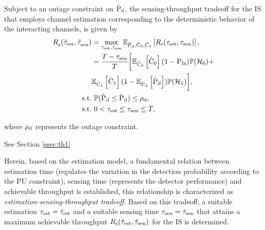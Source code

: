 \begin{theorem} \label{th_IS:th2}
\normalfont
Subject to an outage constraint on $\hat{\text{P}}_{\text{d}}$, the sensing-throughput tradeoff for the IS that employs channel estimation corresponding to the deterministic behavior of the interacting channels, is given by  
\begin{align}
{R}_{\text{s}}^{\text{}}(\tilde{\tau}_{\text{est}}, \tilde{\tau}_{\text{sen}}^{\text{}}) &= \operatorname*{max}_{\tau_{\text{est}}, \tau_{\text{sen}}} {\mathbb E}_{\hat{\text{P}}_{\text{d}}, \hat{\text{C}}_{\text{0}}, \hat{\text{C}}_{\text{1}}}\left[ R_{\text{s}}(\tau_{\text{est}}, \tau_{\text{sen}}) \right], \nonumber \\ 
\quad &= \frac{T- \tau_{\text{sen}}}{T} \bigg[ {\mathbb E}_{\hat{\text{C}}_{\text{0}}}\left[ \hat{\text{C}}_{\text{0}} \right] (1 - \text{P}_{\text{fa}}) \mathbb P(\mathcal{H}_0) + \nonumber \\ \quad & {\mathbb E}_{\hat{\text{C}}_{\text{1}}}\left[ \hat{\text{C}}_{\text{1}} \right] (1 - {\mathbb E}_{\hat{\text{P}}_{\text{d}}}\left[ \hat{\text{P}}_{\text{d}} \right]) \mathbb P(\mathcal{H}_1)  \bigg], \label{eq_IS:thr_OC} \\
\text{s.t.} & \text{ }  \mathbb P(\hat{\text{P}}_{\text{d}} \le \bar{\text{P}}_{\text{d}}) \le \rho_{\text{d}}, \label{eq_IS:OC} \\
\text{s.t.} & \text{ }  0 < \tau_{\text{est}} \le \tau_{\text{sen}} \le T, \nonumber
\end{align}
\end{theorem} 
where $\rho_{\text{d}}$ represents the outage constraint. 

\begin{IEEEproof} 
See Section \ref{ssec:th1}
\end{IEEEproof} 


\begin{remark} \label{rem:rem1}
\normalfont
Herein, based on the estimation model, a fundamental relation between estimation time (regulates the variation in the detection probability according to the PU constraint), sensing time (represents the detector performance) and achievable throughput is established, this relationship is characterized as \textit{estimation-sensing-throughput tradeoff}. Based on this tradeoff, a suitable estimation $\tau_{\text{est}} = \tilde{\tau}_{\text{est}}$ and a suitable sensing time $\tau_{\text{sen}} = \tilde{\tau}_{\text{sen}}$ that attains a maximum achievable throughput $R_{\text{s}}(\tilde{\tau}_{\text{est}},\tilde{\tau}_{\text{sen}})$ for the IS is determined.  
\end{remark}

